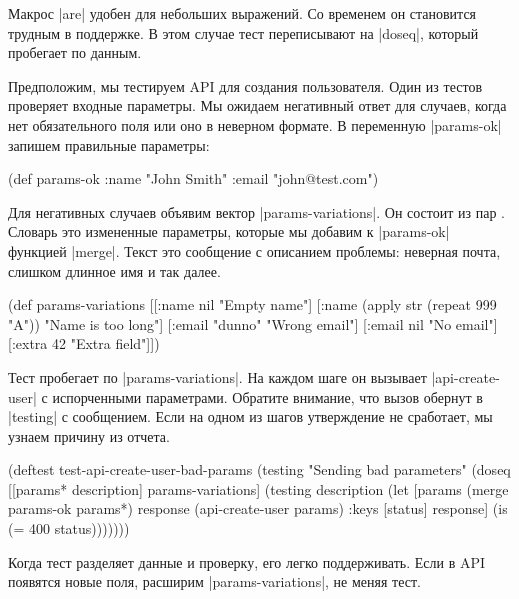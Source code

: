 Макрос \spverb|are| удобен для небольших выражений. Со временем он становится
трудным в поддержке. В этом случае тест переписывают на \spverb|doseq|, который
пробегает по данным.

Предположим, мы тестируем API для создания пользователя. Один из тестов
проверяет входные параметры. Мы ожидаем негативный ответ для случаев, когда нет
обязательного поля или оно в неверном формате. В переменную \spverb|params-ok|
запишем правильные параметры:

\begin{english}
  \begin{clojure}
(def params-ok {:name "John Smith" :email "john@test.com"})
  \end{clojure}
\end{english}

Для негативных случаев объявим вектор \spverb|params-variations|. Он состоит из
пар . Словарь это измененные параметры, которые
мы добавим к \spverb|params-ok| функцией \spverb|merge|. Текст это сообщение с
описанием проблемы: неверная почта, слишком длинное имя и так далее.

\begin{english}
  \begin{clojure}
(def params-variations
  [[{:name nil} "Empty name"]
   [{:name (apply str (repeat 999 "A"))} "Name is too long"]
   [{:email "dunno"} "Wrong email"]
   [{:email nil} "No email"]
   [{:extra 42} "Extra field"]])
  \end{clojure}
\end{english}

Тест пробегает по \spverb|params-variations|. На каждом шаге он вызывает
\spverb|api-create-user| с испорченными параметрами. Обратите внимание, что
вызов обернут в \spverb|testing| с сообщением. Если на одном из шагов
утверждение не сработает, мы узнаем причину из отчета.

\begin{english}
  \begin{clojure}
(deftest test-api-create-user-bad-params
  (testing "Sending bad parameters"
    (doseq [[params* description] params-variations]
      (testing description
        (let [params (merge params-ok params*)
              response (api-create-user params)
              {:keys [status]} response]
          (is (= 400 status)))))))
  \end{clojure}
\end{english}

Когда тест разделяет данные и проверку, его легко поддерживать. Если в API
появятся новые поля, расширим \spverb|params-variations|, не меняя тест.

